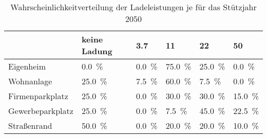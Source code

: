 {
\renewcommand{\arraystretch}{1.2}%
\begin{table}[H]
	\begin{center}
		\caption{Wahrscheinlichkeitverteilung der Ladeleistungen je \UC für das Stützjahr \num{2050}}
		\begin{tabu} to \textwidth {X[1.7] X[1.3, r] X[1, r] X[1, r] X[1, r] X[1, r]}
			\hline
			\UC  & keine Ladung        & \SI{3.7}{\kw}      & \SI{11}{\kw}        & \SI{22}{\kw}        & \SI{50}{\kw}        \\ \hline
			Eigenheim        & \SI{0.0}{\percent}  & \SI{0.0}{\percent} & \SI{75.0}{\percent} & \SI{25.0}{\percent} & \SI{0.0}{\percent}  \\
			Wohnanlage       & \SI{25.0}{\percent} & \SI{7.5}{\percent} & \SI{60.0}{\percent} & \SI{7.5}{\percent}  & \SI{0.0}{\percent}  \\
			Firmenparkplatz  & \SI{25.0}{\percent} & \SI{0.0}{\percent} & \SI{30.0}{\percent} & \SI{30.0}{\percent} & \SI{15.0}{\percent} \\
			Gewerbeparkplatz & \SI{25.0}{\percent} & \SI{0.0}{\percent} & \SI{7.5}{\percent}  & \SI{45.0}{\percent} & \SI{22.5}{\percent} \\
			Straßenrand      & \SI{50.0}{\percent} & \SI{0.0}{\percent} & \SI{20.0}{\percent} & \SI{20.0}{\percent} & \SI{10.0}{\percent} \\ \hline
		\end{tabu}
		\label{tab:UCProbability2050}
	\end{center}
	\vspace{-3mm}%
\end{table}
}